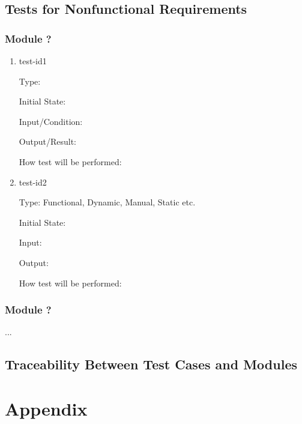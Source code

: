 \documentclass[12pt, titlepage]{article}
\begin{document}
\subsection{Tests for Nonfunctional Requirements}


\subsubsection{Module ?}
		
\begin{enumerate}

\item{test-id1\\}

Type: 
					
Initial State: 
					
Input/Condition: 
					
Output/Result: 
					
How test will be performed: 
					
\item{test-id2\\}

Type: Functional, Dynamic, Manual, Static etc.
					
Initial State: 
					
Input: 
					
Output: 
					
How test will be performed: 

\end{enumerate}

\subsubsection{Module ?}

...

\subsection{Traceability Between Test Cases and Modules}

				




\newpage

\section{Appendix}
\end{document}

